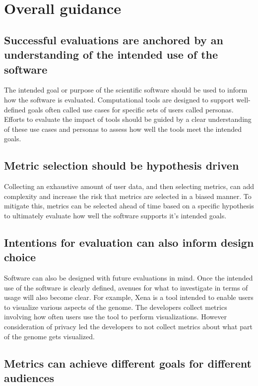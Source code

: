 \documentclass{article}
\begin{document}
\section{Overall guidance}





\subsection{Successful evaluations are anchored by an understanding of the intended use of the software}
\label{sec:use_understanding}
The intended goal or purpose of the scientific software should be used to inform how the software is evaluated. Computational tools are designed to support well-defined goals often called use cases \cite{gamma_design_1995} for specific sets of users called personas\cite{cooper_inmates_2004}. Efforts to evaluate the impact of tools should be guided by a clear understanding of these use cases and personas to assess how well the tools meet the intended goals.  

\subsection{Metric selection should be hypothesis driven} 
\label{sec:hypothesis_driven}
Collecting an exhaustive amount of user data, and then selecting metrics, can add complexity and increase the risk that metrics are selected in a biased manner. To mitigate this, metrics can be selected ahead of time based on a specific hypothesis to ultimately evaluate how well the software supports it’s intended goals. 


\subsection{Intentions for evaluation can also inform design choice} Software can also be designed with future evaluations in mind. Once the intended use of the software is clearly defined, avenues for what to investigate in terms of usage will also become clear. For example, Xena \cite{xena_2020} is a tool intended to enable users to visualize various aspects of the genome. The developers collect metrics involving how often users use the tool to perform  visualizations. However consideration of privacy led the developers to not collect metrics about what part of the genome gets visualized. 




\subsection{Metrics can achieve different goals for different audiences}
\end{document}
